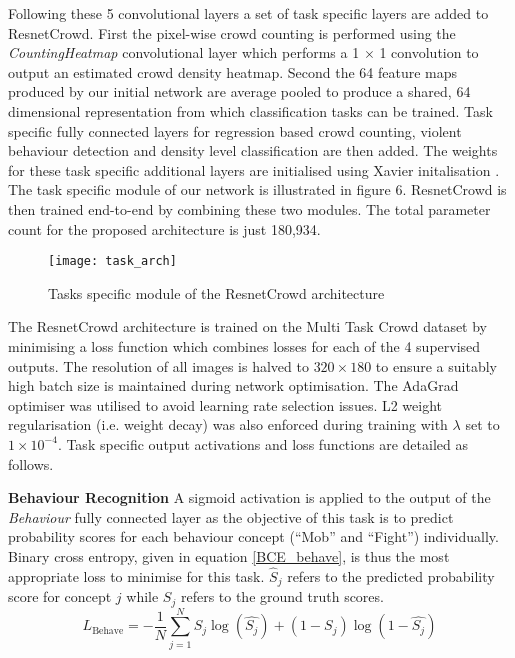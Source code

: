 \documentclass[10pt,twocolumn,letterpaper]{article}
\begin{document}
Following these 5 convolutional layers a set of task specific layers are added to ResnetCrowd. First the pixel-wise crowd counting is performed using the  \textit{CountingHeatmap} convolutional layer which performs a 1 $\times$ 1 convolution to output an estimated crowd density heatmap. Second the 64 feature maps produced by our initial network are average pooled to produce a shared, 64 dimensional representation from which classification tasks can be trained. Task specific fully connected layers for regression based crowd counting, violent behaviour detection and density level classification are then added. The weights for these task specific additional layers are initialised using Xavier initalisation \cite{glorot2010understanding}.  The task specific module of our network is illustrated in figure 6. ResnetCrowd is then trained end-to-end by combining these two modules. The total parameter count for the proposed architecture is just 180,934.


\begin{figure}[h!]
	\centering
	\texttt{[image: task\_arch]}   
	\label{task_arch}
    \caption{Tasks specific module of the ResnetCrowd architecture}
\end{figure}



The ResnetCrowd architecture is trained on the Multi Task Crowd dataset by minimising a loss function which combines losses for each of the 4 supervised outputs. The resolution of all images is halved to $320 \times 180$ to ensure a suitably high batch size is maintained during network optimisation. The AdaGrad optimiser \cite{duchi2011adaptive} was utilised to avoid learning rate selection issues. L2 weight regularisation (i.e. weight decay) was also enforced during training with $\lambda$ set to $1 \times 10^{-4}$. Task specific output activations and loss functions are detailed as follows. 

\textbf{Behaviour Recognition} A sigmoid activation is applied to the output of the \textit{Behaviour} fully connected layer as the objective of this task is to predict probability scores for each behaviour concept (``Mob'' and ``Fight'') individually. Binary cross entropy, given in equation \ref{BCE_behave}, is thus the most appropriate loss to minimise for this task. $\hat{S}_j$ refers to the predicted probability score for concept $j$ while $S_j$ refers to the ground truth scores.
\begin{equation}
L_{\text{Behave}}=-\frac{1}{N}\sum_{j=1}^{N}S_{j}\log(\hat{S_{j}})+(1-S_{j})\log(1-\hat{S_{j}})
\label{BCE_behave}
\end{equation}
\end{document}
